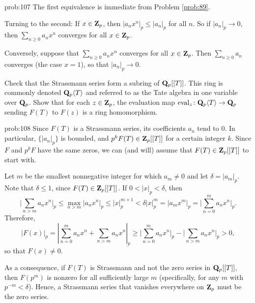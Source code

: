\begin{sol}{prob:107} The first equivalence is immediate from Problem \ref{prob:89}. 

Turning to the second: If $x \in \mathbf{Z}_p$, then $|a_n x^n|_p \le |a_n|_p$ for all $n$. So if $|a_n|_p\to 0$, then $\sum_{n\ge 0} a_n x^n$ converges for all $x \in \mathbf{Z}_p$.

Conversely, suppose that $\sum_{n\ge 0} a_n x^n$ converges for all $x \in \mathbf{Z}_p$. Then $\sum_{n\ge 0} a_n$ converges (the case $x=1$), so that $|a_n|_p  \to 0$.
\end{sol}

\begin{challenge} Check that the Strassmann series form a subring of $\mathbf{Q}_p[[T]]$. This ring is commonly denoted $\mathbf{Q}_p\langle T\rangle$ and referred to as the \textsf{Tate algebra in one variable over $\mathbf{Q}_p$}. 
Show that for each $z \in \mathbf{Z}_p$, the evaluation map $\mathrm{eval}_z\colon \mathbf{Q}_p\langle T\rangle \to \mathbf{Q}_p$ sending $F(T)$ to $F(z)$ is a ring homomorphism.
\end{challenge}

\begin{sol}{prob:108} Since $F(T)$ is a Strassmann series, its coefficients $a_n$ tend to $0$. In particular, $\{|a_n|_p\}$ is bounded, and $p^k F(T) \in \mathbf{Z}_p[[T]]$ for a certain integer $k$. Since $F$ and $p^k F$ have the same zeros, we can (and will) assume that $F(T) \in \mathbf{Z}_p[[T]]$ to start with.

Let $m$ be the smallest nonnegative integer for which $a_m\ne 0$ and let $\delta = |a_m|_p$. Note that $\delta \le 1$, since $F(T) \in \mathbf{Z}_p[[T]]$. If $0 < |x|_p < \delta$, then
\[ \bigg|\sum_{n > m} a_n x^n\bigg|_p \le \max_{n > m}{|a_n x^n|_p} \le |x|_p^{m+1} < \delta |x|_p^{m} = |a_m x^m|_p = \bigg|\sum_{n=0}^{m} a_n x^n\bigg|_p.\]
Therefore,
\[ |F(x)|_p = \left|\sum_{n=0}^{m} a_n x^n + \sum_{n > m} a_n x^n\right|_p \ge \bigg|\sum_{n=0}^{m} a_n x^n\bigg|_p - \bigg|\sum_{n>m} a_n x^n\bigg|_p > 0, \]
so that $F(x)\ne 0$.

As a consequence, if $F(T)$ is Strassmann and not the zero series in $\mathbf{Q}_p[[T]]$, then $F(p^m)$ is nonzero for all sufficiently large $m$ (specifically, for any $m$ with $p^{-m} < \delta$). Hence, a Strassmann series that vanishes everywhere on $\mathbf{Z}_p$ must be the zero series.
\end{sol}

